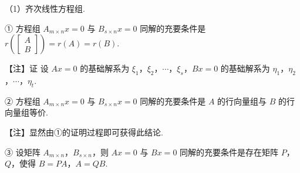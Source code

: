 

（1）齐次线性方程组.

① 方程组 $A_{m\times n}x=0$ 与 $B_{s\times n}x=0$ 同解的充要条件是 $r\left(\begin{bmatrix}A\\B\end{bmatrix}\right)=r(A)=r(B)$.

\begin{fnote}
【注】证 设 $Ax=0$ 的基础解系为 $\xi_1$，$\xi_2$，$\cdots$，$\xi_s$，$Bx=0$ 的基础解系为 $\eta_1$，$\eta_2$，$\cdots$，$\eta_t$.

\end{fnote}

② 方程组 $A_{m\times n}x=0$ 与 $B_{s\times n}x=0$ 同解的充要条件是 $A$ 的行向量组与 $B$ 的行向量组等价.

\begin{fnote}
【注】显然由①的证明过程即可获得此结论.
\end{fnote}

③ 设矩阵 $A_{m\times n}$，$B_{s\times n}$，则 $Ax=0$ 与 $Bx=0$ 同解的充要条件是存在矩阵 $P$，$Q$，使得 $B=PA$，$A=QB$.

